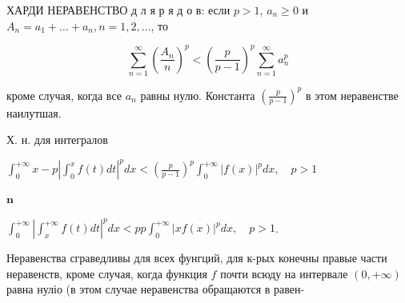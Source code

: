 \documentclass[10pt]{article}
\begin{document}
ХАРДИ НЕРАВЕНСТВО д л я р я д о в: если $p>1$, $a_{n} \geqslant 0$ и $A_{n}=a_{1}+\ldots+a_{n}, n=1,2, \ldots$, то



\[

\sum_{n=1}^{\infty}\left(\frac{A_{n}}{n}\right)^{p}<\left(\frac{p}{p-1}\right)^{p} \sum_{n=1}^{\infty} a_{n}^{p}

\]



кроме случая, когда все $a_{n}$ равны нулю. Константа $\left(\frac{p}{p-1}\right)^{p}$ в этом неравенстве наилутшая.



Х. н. для интегралов



$\int_{0}^{+\infty} x-p\left|\int_{0}^{x} f(t) d t\right|^{p} d x<\left(\frac{p}{p-1}\right)^{p} \int_{0}^{+\infty}|f(x)|^{p} d x, \quad p>1$



$\mathbf{n}$



$\int_{0}^{+\infty}\left|\int_{x}^{+\infty} f(t) d t\right|^{p} d x<p p \int_{0}^{+\infty}|x f(x)|^{p} d x, \quad p>1$.



Неравенства сграведливы для всех фунгций, для к-рых конечны правые части неравенств, кроме случая, когда функция $f$ почти всюду на интервале $(0,+\infty)$ равна нуліо (в этом случае неравенства обращаются в равен-
\end{document}
